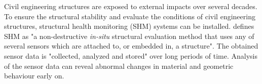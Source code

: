 \documentclass[12pt]{scrartcl}
\begin{document}
%
%
%
%
%
%
%
%

Civil engineering structures are exposed to external impacts over several decades. 
To ensure the structural stability and evaluate the conditions of civil engineering structures, structural health monitoring (SHM) systems can be installed.
\cite[4]{BisbySHM} defines SHM as "a non-destructive \textit{in-situ} structural evaluation method that uses any of several sensors which are attached to, or embedded in, a structure". 
The obtained sensor data is "collected, analyzed and stored" over long periods of time.
Analysis of the sensor data can reveal abnormal changes in material and geometric behaviour early on.
\end{document}
